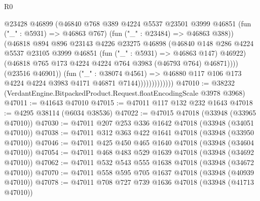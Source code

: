 \begin{lexlean}{R0}
\begin{coremodule}
                                  @23428
                                  @46899
                                  (@46840
                                    @768
                                    @389
                                    @4224
                                    @5537
                                    @23501
                                    @3999
                                    @46851
                                    (fun ("_" : @5931) => @46863 @767)
                                    (fun ("_" : @23484) => @46863 @388))
                                  (@46818
                                    @894
                                    @896
                                    @23143
                                    @4226
                                    @23275
                                    @46898
                                    (@46840
                                      @148
                                      @286
                                      @4224
                                      @5537
                                      @23105
                                      @3999
                                      @46851
                                      (fun ("_" : @5931) => @46863 @147)
                                      @46922)
                                    (@46818
                                      @765
                                      @173
                                      @4224
                                      @4224
                                      @764
                                      @3983
                                      (@46793 @764)
                                      @46871))))
                              (@23516 @46901))
                            (fun ("_" : @38074 @4561) =>
                            @46880 @117 @106 @173 @4224 @4224 @3983 @4171 @46871 @7144)))))))))))))
@47010 := @38232 (VerdantEngine.BitpackedProduct.Request.floatEncodingScale @3978 @3968)
@47011 := @41643 @47010
@47015 := @47011 @117 @132 @232 @1643
@47018 := @4295 @38114 (@6034 @38536)
@47022 := @47015 @47018 (@33948 (@33965 @47010))
@47030 := @47011 @207 @253 @336 @1642 @47018 (@33948 (@34051 @47010))
@47038 := @47011 @312 @363 @422 @1641 @47018 (@33948 (@33950 @47010))
@47046 := @47011 @425 @450 @465 @1640 @47018 (@33948 (@34604 @47010))
@47054 := @47011 @468 @483 @529 @1639 @47018 (@33948 (@34692 @47010))
@47062 := @47011 @532 @543 @555 @1638 @47018 (@33948 (@34672 @47010))
@47070 := @47011 @558 @595 @705 @1637 @47018 (@33948 (@40939 @47010))
@47078 := @47011 @708 @727 @739 @1636 @47018 (@33948 (@41713 @47010))

\end{coremodule}
\end{lexlean}
